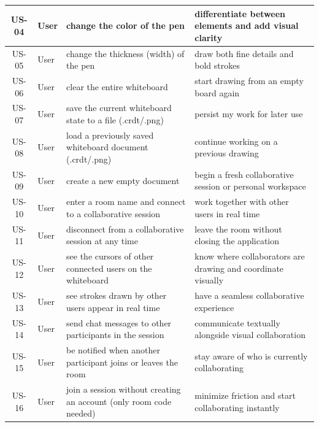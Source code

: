 \documentclass[a4paper,11pt,twoside]{report}
\theoremstyle{definition}
\begin{document}
\begin{table}[H]
\begin{tabular}{|c|p{}|p{}|p{}|}
		\hline
		US-04 & User & change the color of the pen & differentiate between elements and add visual clarity \\
		\hline
		US-05 & User & change the thickness (width) of the pen & draw both fine details and bold strokes \\
		\hline
		US-06 & User & clear the entire whiteboard & start drawing from an empty board again \\
		\hline
		US-07 & User & save the current whiteboard state to a file (.crdt/.png) & persist my work for later use \\
		\hline
		US-08 & User & load a previously saved whiteboard document (.crdt/.png) & continue working on a previous drawing \\
		\hline
		US-09 & User & create a new empty document & begin a fresh collaborative session or personal workspace \\
		\hline
		US-10 & User & enter a room name and connect to a collaborative session & work together with other users in real time \\
		\hline
		US-11 & User & disconnect from a collaborative session at any time & leave the room without closing the application \\
		\hline
		US-12 & User & see the cursors of other connected users on the whiteboard & know where collaborators are drawing and coordinate visually \\
		\hline
		US-13 & User & see strokes drawn by other users appear in real time & have a seamless collaborative experience \\
		\hline
		US-14 & User & send chat messages to other participants in the session & communicate textually alongside visual collaboration \\
		\hline
		US-15 & User & be notified when another participant joins or leaves the room & stay aware of who is currently collaborating \\
		\hline
		US-16 & User & join a session without creating an account (only room code needed) & minimize friction and start collaborating instantly \\
		\hline
	\end{tabular}
	\label{tab:user-stories-user-2}
\end{table}
\end{document}
